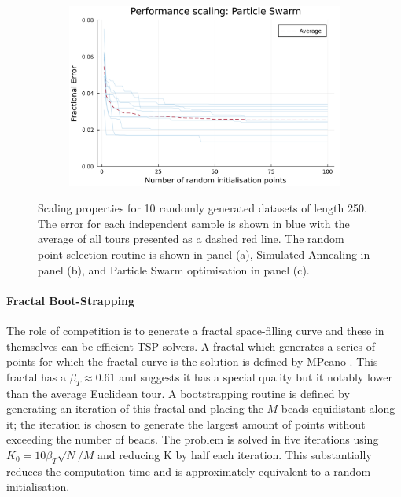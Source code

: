 \begin{figure}
\begin{subfigure}{0.7\textwidth}
	\caption{}
\end{subfigure}
~
\begin{subfigure}{0.7\textwidth}
	\centering
	\includegraphics[width=\textwidth]{images/elastic_neighbourhood/fig_initialisation_npoints_particle_swarm}
	\caption{}
\end{subfigure}

	\def\c{Scaling properties for 10 randomly generated datasets of length 250. }
	\caption[\c]{\label{fig:metaheuristics} Scaling properties for 10 randomly generated datasets of length 250. The error for each independent sample is shown in blue with the average of all tours presented as a dashed red line. The random point selection routine is shown in panel (a), Simulated Annealing in panel (b), and Particle Swarm optimisation in panel (c).}
\end{figure}

\paragraph{Fractal Boot-Strapping}
The role of competition is to generate a fractal space-filling curve and these in themselves can be efficient TSP solvers. A fractal which generates a series of points for which the fractal-curve is the solution is defined by MPeano \cite{Moscato1994-nf}. This fractal has a $\beta_T \approx 0.61$ and suggests it has a special quality but it notably lower than the average Euclidean tour. A bootstrapping routine is defined by generating an iteration of this fractal and placing the $M$ beads equidistant along it; the iteration is chosen to generate the largest amount of points without exceeding the number of beads. The problem is solved in five iterations using $K_0 = 10\beta_T\sqrt{N}/M$ and reducing K by half each iteration. This substantially reduces the computation time and is approximately equivalent to a random initialisation.
